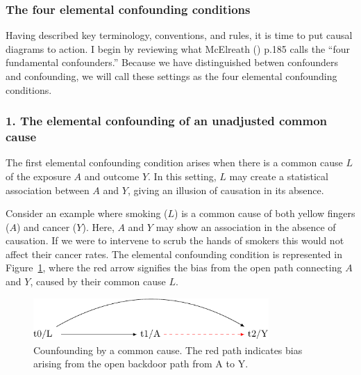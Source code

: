\documentclass[
  singlecolumn,
  9pt]{article}
\begin{document}
\subsubsection{The four elemental confounding
conditions}\label{the-four-elemental-confounding-conditions}

Having described key terminology, conventions, and rules, it is time to
put causal diagrams to action. I begin by reviewing what McElreath
() p.185 calls the ``four fundamental
confounders.'' Because we have distinguished betwen confounders and
confounding, we will call these settings as the four elemental
confounding conditions.

\subsubsection{1. The elemental confounding of an unadjusted common
cause}\label{the-elemental-confounding-of-an-unadjusted-common-cause}

The first elemental confounding condition arises when there is a common
cause \(L\) of the exposure \(A\) and outcome \(Y\). In this setting,
\(L\) may create a statistical association between \(A\) and \(Y\),
giving an illusion of causation in its absence.

Consider an example where smoking (\(L\)) is a common cause of both
yellow fingers (\(A\)) and cancer (\(Y\)). Here, \(A\) and \(Y\) may
show an association in the absence of causation. If we were to intervene
to scrub the hands of smokers this would not affect their cancer rates.
The elemental confounding condition is represented in
Figure~\ref{fig-dag-common-cause}, where the red arrow signifies the
bias from the open path connecting \(A\) and \(Y\), caused by their
common cause \(L\).

\begin{figure}

{\centering \includegraphics[width=0.8\textwidth,height=\textheight]{causal-dags_files/figure-pdf/fig-dag-common-cause-1.pdf}

}

\caption{\label{fig-dag-common-cause}Counfounding by a common cause. The
red path indicates bias arising from the open backdoor path from A to
Y.}

\end{figure}
\end{document}
